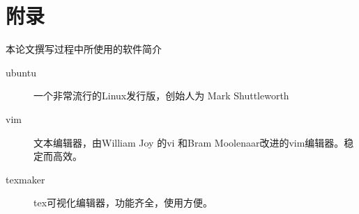 \section*{附录}
本论文撰写过程中所使用的软件简介

\begin{description}
\item[ubuntu] 一个非常流行的Linux发行版，创始人为  Mark Shuttleworth
\item[vim] 文本编辑器，由William Joy 的vi 和Bram Moolenaar改进的vim编辑器。稳定而高效。
\item[texmaker] tex可视化编辑器，功能齐全，使用方便。
\end{description}